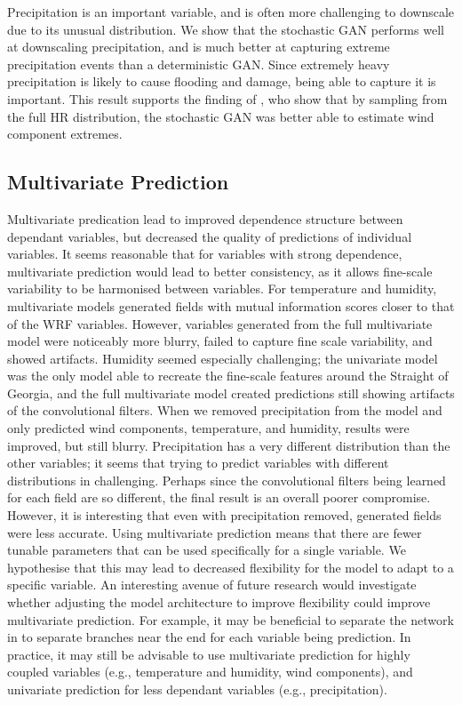 \documentclass{ametsocV6.1}
\begin{document}
Precipitation is an important variable, and is often more challenging to downscale due to its unusual distribution. We show that the stochastic GAN performs well at downscaling precipitation, and is much better at capturing extreme precipitation events than a deterministic GAN. Since extremely heavy precipitation is likely to cause flooding and damage, being able to capture it is important. This result supports the finding of \citet{daust2024capturing}, who show that by sampling from the full HR distribution, the stochastic GAN was better able to estimate wind component extremes. 

\subsection{Multivariate Prediction}
Multivariate predication lead to improved dependence structure between dependant variables, but decreased the quality of predictions of individual variables. It seems reasonable that for variables with strong dependence, multivariate prediction would lead to better consistency, as it allows fine-scale variability to be harmonised between variables. For temperature and humidity, multivariate models generated fields with mutual information scores closer to that of the WRF variables. However, variables generated from the full multivariate model were noticeably more blurry, failed to capture fine scale variability, and showed artifacts. Humidity seemed especially challenging; the univariate model was the only model able to recreate the fine-scale features around the Straight of Georgia, and the full multivariate model created predictions still showing artifacts of the convolutional filters. When we removed precipitation from the model and only predicted wind components, temperature, and humidity, results were improved, but still blurry. Precipitation has a very different distribution than the other variables; it seems that trying to predict variables with different distributions in challenging. Perhaps since the convolutional filters being learned for each field are so different, the final result is an overall poorer compromise. However, it is interesting that even with precipitation removed, generated fields were less accurate. Using multivariate prediction means that there are fewer tunable parameters that can be used specifically for a single variable. We hypothesise that this may lead to decreased flexibility for the model to adapt to a specific variable. An interesting avenue of future research would investigate whether adjusting the model architecture to improve flexibility could improve multivariate prediction. For example, it may be beneficial to separate the network in to separate branches near the end for each variable being prediction. In practice, it may still be advisable to use multivariate prediction for highly coupled variables (e.g., temperature and humidity, wind components), and univariate prediction for less dependant variables (e.g., precipitation). 
\end{document}
